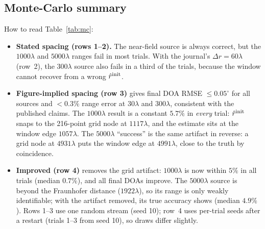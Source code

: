 \documentclass[11pt,a4paper]{article}
\begin{document}
\clearpage
\subsection{Monte-Carlo summary}


\noindent How to read Table~\ref{tab:mc}:
\begin{itemize}
\item \textbf{Stated spacing (rows 1--2).} The near-field source is always correct, but the $1000\lambda$ and $5000\lambda$
ranges fail in most trials. With the journal's $\Delta r=60\lambda$ (row~2), the $300\lambda$ source also fails in a third of
the trials, because the window cannot recover from a wrong $\hat r^{\rm init}$.
\item \textbf{Figure-implied spacing (row 3)} gives final DOA RMSE $\le0.05^\circ$ for all sources and $<0.3\%$ range error at
$30\lambda$ and $300\lambda$, consistent with the published claims. The $1000\lambda$ result is a constant $5.7\%$ in \emph{every}
trial: $\hat r^{\rm init}$ snaps to the 216-point grid node at $1117\lambda$, and the estimate sits at the window edge
$1057\lambda$. The $5000\lambda$ ``success'' is the same artifact in reverse: a grid node at $4931\lambda$ puts the window edge
at $4991\lambda$, close to the truth by coincidence.
\item \textbf{Improved (row 4)} removes the grid artifact: $1000\lambda$ is now within $5\%$ in all trials (median $0.7\%$), and
all final DOAs improve. The $5000\lambda$ source is beyond the Fraunhofer distance ($1922\lambda$), so its range is only weakly
identifiable; with the artifact removed, its true accuracy shows (median $4.9\%$). Rows 1--3 use one random stream
(seed 10); row~4 uses per-trial seeds after a restart (trials 1--3 from seed 10), so draws differ slightly.
\end{itemize}

\end{document}
